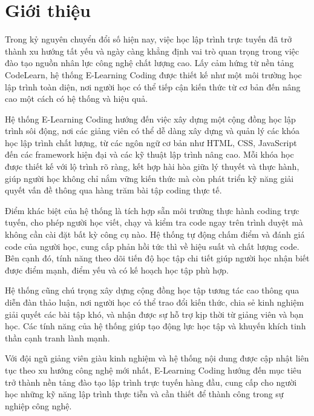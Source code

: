 \section{Giới thiệu}
Trong kỷ nguyên chuyển đổi số hiện nay, việc học lập trình trực tuyến đã trở thành xu hướng tất yếu và ngày càng khẳng định vai trò quan trọng trong việc đào tạo nguồn nhân lực công nghệ chất lượng cao. Lấy cảm hứng từ nền tảng CodeLearn, hệ thống E-Learning Coding được thiết kế như một môi trường học lập trình toàn diện, nơi người học có thể tiếp cận kiến thức từ cơ bản đến nâng cao một cách có hệ thống và hiệu quả.

Hệ thống E-Learning Coding hướng đến việc xây dựng một cộng đồng học lập trình sôi động, nơi các giảng viên có thể dễ dàng xây dựng và quản lý các khóa học lập trình chất lượng, từ các ngôn ngữ cơ bản như HTML, CSS, JavaScript đến các framework hiện đại và các kỹ thuật lập trình nâng cao. Mỗi khóa học được thiết kế với lộ trình rõ ràng, kết hợp hài hòa giữa lý thuyết và thực hành, giúp người học không chỉ nắm vững kiến thức mà còn phát triển kỹ năng giải quyết vấn đề thông qua hàng trăm bài tập coding thực tế.

Điểm khác biệt của hệ thống là tích hợp sẵn môi trường thực hành coding trực tuyến, cho phép người học viết, chạy và kiểm tra code ngay trên trình duyệt mà không cần cài đặt bất kỳ công cụ nào. Hệ thống tự động chấm điểm và đánh giá code của người học, cung cấp phản hồi tức thì về hiệu suất và chất lượng code. Bên cạnh đó, tính năng theo dõi tiến độ học tập chi tiết giúp người học nhận biết được điểm mạnh, điểm yếu và có kế hoạch học tập phù hợp.

Hệ thống cũng chú trọng xây dựng cộng đồng học tập tương tác cao thông qua diễn đàn thảo luận, nơi người học có thể trao đổi kiến thức, chia sẻ kinh nghiệm giải quyết các bài tập khó, và nhận được sự hỗ trợ kịp thời từ giảng viên và bạn học. Các tính năng của hệ thống giúp tạo động lực học tập và khuyến khích tinh thần cạnh tranh lành mạnh.

Với đội ngũ giảng viên giàu kinh nghiệm và hệ thống nội dung được cập nhật liên tục theo xu hướng công nghệ mới nhất, E-Learning Coding hướng đến mục tiêu trở thành nền tảng đào tạo lập trình trực tuyến hàng đầu, cung cấp cho người học những kỹ năng lập trình thực tiễn và cần thiết để thành công trong sự nghiệp công nghệ.


